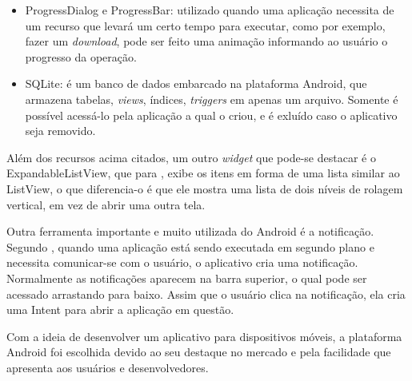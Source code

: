 \begin{itemize}
			\item ProgressDialog e ProgressBar: utilizado quando uma aplicação necessita
			de um recurso que levará um certo tempo para executar, como por exemplo,
			fazer um \textit{download}, pode ser feito uma animação informando ao
			usuário o progresso da operação.
			 
			\item SQLite: é um banco de dados embarcado na plataforma Android, que
			armazena tabelas, \textit{views}, índices, \textit{triggers} em apenas um
			arquivo. Somente é possível acessá-lo pela aplicação a qual o criou, e é
			exluído caso o aplicativo seja removido.
	
		\end{itemize}
	
	\par Além dos recursos acima citados, um outro \textit{widget} que pode-se
destacar é o ExpandableListView, que para , exibe os itens
em forma de uma lista similar ao ListView, o que diferencia-o é que ele mostra
uma lista de dois níveis de rolagem vertical, em vez de abrir uma outra tela.

	\par Outra ferramenta importante e muito utilizada do Android é a notificação.
Segundo , quando uma aplicação está sendo executada em
segundo plano e necessita comunicar-se com o usuário, o aplicativo cria uma
notificação. Normalmente as notificações aparecem na barra superior, o qual
pode ser acessado arrastando para baixo. Assim que o usuário clica na
notificação, ela cria uma Intent para abrir a aplicação em questão.

	\par Com a ideia de desenvolver um aplicativo para dispositivos móveis, a
plataforma Android foi escolhida devido ao seu destaque no mercado e pela
facilidade que apresenta aos usuários e desenvolvedores.
